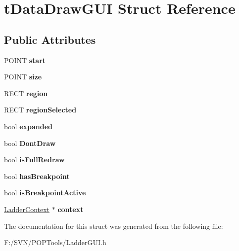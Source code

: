 \hypertarget{structt_data_draw_g_u_i}{\section{t\-Data\-Draw\-G\-U\-I Struct Reference}
\label{structt_data_draw_g_u_i}
}
\subsection*{Public Attributes}
\begin{DoxyCompactItemize}
\item 
\hypertarget{structt_data_draw_g_u_i_a12abe156d9b5babc16d5b4c1c8c21c04}{P\-O\-I\-N\-T {\bfseries start}}\label{structt_data_draw_g_u_i_a12abe156d9b5babc16d5b4c1c8c21c04}

\item 
\hypertarget{structt_data_draw_g_u_i_a882b89a0d537c78e55b010bcc173fb35}{P\-O\-I\-N\-T {\bfseries size}}\label{structt_data_draw_g_u_i_a882b89a0d537c78e55b010bcc173fb35}

\item 
\hypertarget{structt_data_draw_g_u_i_aedc8b19fb0bc9815414f2f880dd95909}{R\-E\-C\-T {\bfseries region}}\label{structt_data_draw_g_u_i_aedc8b19fb0bc9815414f2f880dd95909}

\item 
\hypertarget{structt_data_draw_g_u_i_a8e508544a1cd3d208e5b29887d99bc8a}{R\-E\-C\-T {\bfseries region\-Selected}}\label{structt_data_draw_g_u_i_a8e508544a1cd3d208e5b29887d99bc8a}

\item 
\hypertarget{structt_data_draw_g_u_i_ad8569def2b8458cb616ead418ad13eb1}{bool {\bfseries expanded}}\label{structt_data_draw_g_u_i_ad8569def2b8458cb616ead418ad13eb1}

\item 
\hypertarget{structt_data_draw_g_u_i_aa55b0f6fc75dd5a8a0128495ee2d23b2}{bool {\bfseries Dont\-Draw}}\label{structt_data_draw_g_u_i_aa55b0f6fc75dd5a8a0128495ee2d23b2}

\item 
\hypertarget{structt_data_draw_g_u_i_aaef01b9fd5718ef620b5327d6a1a2a64}{bool {\bfseries is\-Full\-Redraw}}\label{structt_data_draw_g_u_i_aaef01b9fd5718ef620b5327d6a1a2a64}

\item 
\hypertarget{structt_data_draw_g_u_i_a8ff6f81476541b13ca05876a7fe4ec5e}{bool {\bfseries has\-Breakpoint}}\label{structt_data_draw_g_u_i_a8ff6f81476541b13ca05876a7fe4ec5e}

\item 
\hypertarget{structt_data_draw_g_u_i_ad5761bd44604dad30308fb10fba8c4a0}{bool {\bfseries is\-Breakpoint\-Active}}\label{structt_data_draw_g_u_i_ad5761bd44604dad30308fb10fba8c4a0}

\item 
\hypertarget{structt_data_draw_g_u_i_ac7fff636ab1def5fc5187d9fac3b3854}{\hyperlink{struct_ladder_context}{Ladder\-Context} $\ast$ {\bfseries context}}\label{structt_data_draw_g_u_i_ac7fff636ab1def5fc5187d9fac3b3854}

\end{DoxyCompactItemize}


The documentation for this struct was generated from the following file\-:\begin{DoxyCompactItemize}
\item 
F\-:/\-S\-V\-N/\-P\-O\-P\-Tools/Ladder\-G\-U\-I.\-h\end{DoxyCompactItemize}
